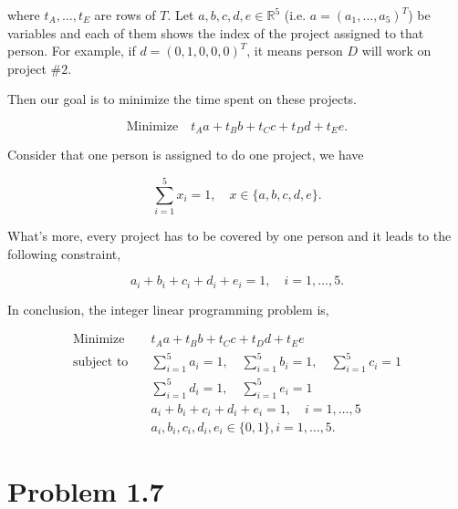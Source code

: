 \documentclass[12pt]{article}
\begin{document}
where $t_A, \dots, t_E$ are rows of $T$. Let $a, b, c, d, e \in \mathbb{R}^5$ (i.e. $a = (a_1, \dots, a_5)^T$) be variables and each of them shows the index of the project assigned to that person. For example, if $d = (0, 1, 0, 0, 0)^T$, it means person $D$ will work on project $\# 2$. 

Then our goal is to minimize the time spent on these projects.

$$
\text{Minimize} \quad t_Aa + t_Bb + t_Cc + t_Dd + t_Ee.
$$

Consider that one person is assigned to do one project, we have 

$$
\sum_{i = 1}^5 x_i = 1, \quad x \in \{a, b, c, d, e\}.
$$

What's more, every project has to be covered by one person and it leads to the following constraint,

$$
a_i + b_i + c_i + d_i + e_i = 1, \quad i = 1, \dots, 5.
$$

In conclusion, the integer linear programming problem is,

\begin{equation*}
\begin{aligned}
\text{Minimize} \quad & t_Aa + t_Bb + t_Cc + t_Dd + t_Ee \\
\text{subject\  to} \quad & \sum_{i = 1}^5 a_i = 1, \quad \sum_{i = 1}^5 b_i = 1, \quad \sum_{i = 1}^5 c_i = 1 \\
& \sum_{i = 1}^5 d_i = 1, \quad \sum_{i = 1}^5 e_i = 1 \\
& a_i + b_i + c_i + d_i + e_i = 1, \quad i = 1, \dots, 5 \\
& a_i, b_i, c_i, d_i, e_i \in \{0, 1\} , i = 1, \dots, 5.
\end{aligned}
\end{equation*}



\section*{Problem 1.7}
\end{document}
